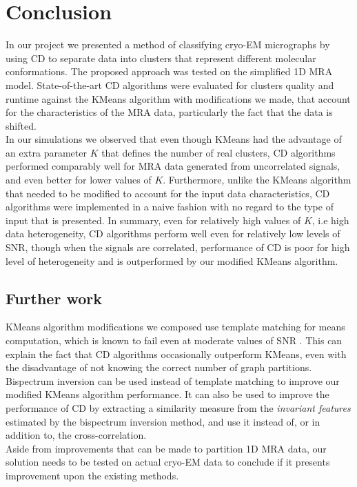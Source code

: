 \center

\section{Conclusion}

\raggedright

In our project we presented a method of classifying \acrshort{cryo-EM} micrographs by using \acrshort{CD} to separate data into clusters that represent different molecular conformations. The proposed approach was tested on the simplified 1D \acrshort{MRA} model. State-of-the-art \acrshort{CD} algorithms were evaluated for clusters quality and runtime against the KMeans algorithm with modifications we made, that account for the characteristics of the \acrshort{MRA} data, particularly the fact that the data is shifted.\\
In our simulations we observed that even though KMeans had the advantage of an extra parameter $K$ that defines the number of real clusters, \acrshort{CD} algorithms performed comparably well for \acrshort{MRA} data generated from uncorrelated signals, and even better for lower values of $K$. Furthermore, unlike the KMeans algorithm that needed to be modified to account for the input data characteristics, \acrshort{CD} algorithms were implemented in a naive fashion with no regard to the type of input that is presented. In summary, even for relatively high values of $K$, i.e high data heterogeneity, \acrshort{CD} algorithms perform well even for relatively low levels of \acrshort{SNR}, though when the signals are correlated, performance of \acrshort{CD} is poor for high level of heterogeneity and is outperformed by our modified KMeans algorithm.

\subsection{Further work}
KMeans algorithm modifications we composed use template matching for means computation, which is known to fail even at moderate values of \acrshort{SNR} \cite{Bendory_2018}. This can explain the fact that \acrshort{CD} algorithms occasionally outperform KMeans, even with the disadvantage of not knowing the correct number of graph partitions. Bispectrum inversion\cite{Bendory_2018} can be used instead of template matching to improve our modified KMeans algorithm performance. It can also be used to improve the performance of \acrshort{CD} by extracting a similarity measure from the \textit{invariant features} estimated by the bispectrum inversion method, and use it instead of, or in addition to, the cross-correlation.\\
Aside from improvements that can be made to partition 1D \acrshort{MRA} data, our solution needs to be tested on actual \acrshort{cryo-EM} data to conclude if it presents improvement upon the existing methods.